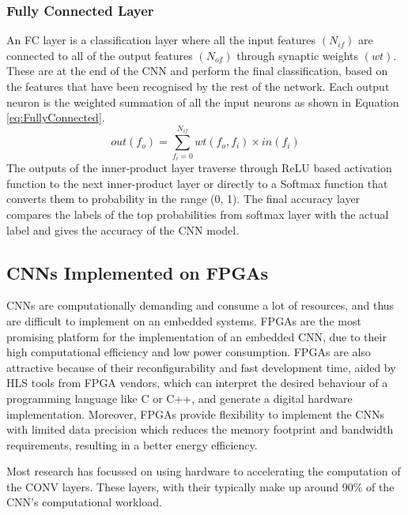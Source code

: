 \documentclass[12pt]{article}
\begin{document}
\subsubsection{Fully Connected Layer}
\label{sec:Background-CNN-FC}
\vspace{-12pt}

An FC layer is a classification layer where all the input features $(N_{if})$ are connected to all of the output features $(N_{of})$ through synaptic weights $(wt)$. These are at the end of the CNN and perform the final classification, based on the features that have been recognised by the rest of the network. Each output neuron is the weighted summation of all the input neurons as shown in Equation \ref{eq:FullyConnected}\cite{fpgaCnnAccelerator}.
\begin{equation}
out(f_o)=\sum^{N_{if}}_{f_i=0}wt(f_o,f_i)\times in(f_i)
\label{eq:FullyConnected}
\end{equation}
The outputs of the inner-product layer traverse through ReLU based activation function to the next inner-product layer or directly to a Softmax function that converts them to probability in the range (0, 1). The final accuracy layer compares the labels of the top probabilities from softmax layer with the actual label and gives the accuracy of the CNN model\cite{fpgaCnnAccelerator}.

\subsection{CNNs Implemented on FPGAs}
\label{sec:Background-CNNsImplementedOnFPGAs}
\vspace{-12pt}

CNNs are computationally demanding and consume a lot of resources, and thus are difficult to implement on an embedded systems. FPGAs are the most promising platform for the implementation of an embedded CNN, due to their high computational efficiency and low power consumption. FPGAs are also attractive because of their reconfigurability and fast development time, aided by HLS tools from FPGA vendors, which can interpret the desired behaviour of a programming language like C or C++, and generate a digital hardware implementation. Moreover, FPGAs provide flexibility to implement the CNNs with limited data precision which reduces the memory footprint and bandwidth requirements, resulting in a better energy efficiency\cite{fpgaCnnAccelerator}.

Most research has focussed on using hardware to accelerating the computation of the CONV layers. These layers, with their  typically make up around 90\% of the CNN's computational workload.
\end{document}
